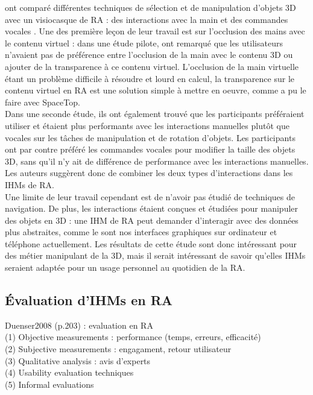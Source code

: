 \cite{Piumsomboon2014} ont comparé différentes techniques de sélection et de manipulation d'objets 3D avec un visiocasque de RA : des interactions avec la main et des commandes vocales . Une des première leçon de leur travail est sur l'occlusion des mains avec le contenu virtuel : dans une étude pilote, \citeauthor{Piumsomboon2014} ont remarqué que les utilisateurs n'avaient pas de préférence entre l'occlusion de la main avec le contenu 3D ou ajouter de la transparence à ce contenu virtuel. L'occlusion de la main virtuelle étant un problème difficile à résoudre et lourd en calcul, la transparence sur le contenu virtuel en RA est une solution simple à mettre en oeuvre, comme a pu le faire \cite{Lee2013} avec SpaceTop.\\
Dans une seconde étude, ils ont également trouvé que les participants préféraient utiliser et étaient plus performants avec les interactions manuelles plutôt que vocales sur les tâches de manipulation et de rotation d'objets. Les participants ont par contre préféré les commandes vocales pour modifier la taille des objets 3D, sans qu'il n'y ait de différence de performance avec les interactions manuelles. Les auteurs suggèrent donc de combiner les deux types d'interactions dans les IHMs de RA.\\
Une limite de leur travail cependant est de n'avoir pas étudié de techniques de navigation. De plus, les interactions étaient conçues et étudiées pour manipuler des objets en 3D : une IHM de RA peut demander d'interagir avec des données plus abstraites, comme le sont nos interfaces graphiques sur ordinateur et téléphone actuellement. Les résultats de cette étude sont donc intéressant pour des métier manipulant de la 3D, mais il serait intéressant de savoir qu'elles IHMs seraient adaptée pour un usage personnel au quotidien de la RA.


\subsection{Évaluation d'IHMs en RA}
Duenser2008 (p.203) : evaluation en RA\\
(1) Objective measurements : performance (temps, erreurs, efficacité)\\
(2) Subjective measurements : engagament, retour utilisateur\\
(3) Qualitative analysis : avis d'experts\\
(4) Usability evaluation techniques\\
(5) Informal evaluations


